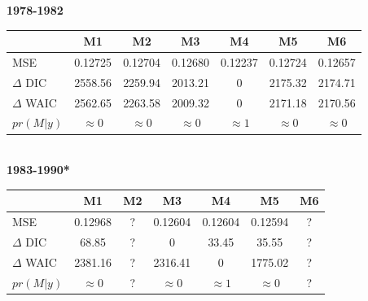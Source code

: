 \documentclass[ xcolor = pdftex, dvipsnames, table ]{beamer}
\begin{document}
%
%

\begin{frame}
\begin{center}
\textbf{1978-1982}
\hspace*{-0.4cm}
\begin{tabular}[c]{@{}lcccccc@{}}
\hline
& M1 & M2 & M3 & M4 & M5 & M6 \\ \hline
MSE & 0.12725 & 0.12704 & 0.12680 & 0.12237 & 0.12724 & 0.12657 \\ %
\(\Delta\) DIC & 2558.56 & 2259.94 & 2013.21 & 0 & 2175.32 & 2174.71 \\ %
\(\Delta\) WAIC & 2562.65 & 2263.58 & 2009.32 & 0 & 2171.18 & 2170.56 \\ %
\(pr(M|y)\) & \(\approx0\) & \(\approx0\) & \(\approx0\) & \(\approx1\) & \(\approx0\) & \(\approx0\) \\ \hline
\end{tabular}

$~$\\
\textbf{1983-1990*}
\hspace*{-0.4cm}
\begin{tabular}[c]{@{}lcccccc@{}}
\hline
& M1 & M2 & M3 & M4 & M5 & M6 \\ \hline
MSE & 0.12968 & ? & 0.12604 & 0.12604 & 0.12594 & ? \\ %
\(\Delta\) DIC &  68.85 & ? & 0 & 33.45 & 35.55 & ? \\ %
\(\Delta\) WAIC & 2381.16 & ? & 2316.41 & 0 & 1775.02 & ? \\ %
\(pr(M|y)\) & $\approx0$ & ? & $\approx0$ & $\approx1$ & $\approx0$ & ? \\ \hline
\end{tabular}
\end{center}
\end{frame}
\end{document}
